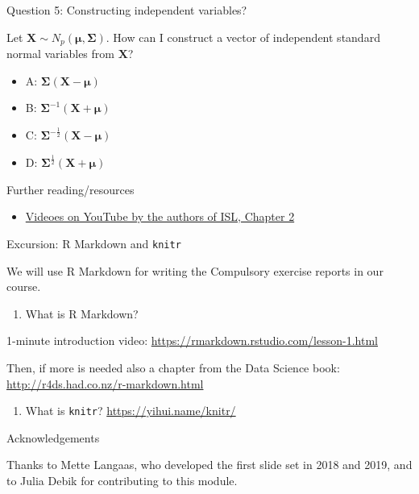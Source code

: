 \documentclass[ignorenonframetext,]{beamer}
\providecommand{\tightlist}{%
  \setlength{\itemsep}{0pt}\setlength{\parskip}{0pt}}
\begin{document}
\begin{frame}

\begin{block}{Question 5: Constructing independent variables?}

\vspace{2mm}

Let \(\boldsymbol{X}\sim N_p(\boldsymbol{\mu},\boldsymbol\Sigma)\). How
can I construct a vector of independent standard normal variables from
\(\boldsymbol{X}\)?

\begin{itemize}
\tightlist
\item
  A: \(\boldsymbol\Sigma(\boldsymbol{X}-\boldsymbol{\mu})\)
\item
  B: \(\boldsymbol\Sigma^{-1}(\boldsymbol{X}+\boldsymbol{\mu})\)
\item
  C:
  \(\boldsymbol\Sigma^{-\frac{1}{2}}(\boldsymbol{X}-\boldsymbol{\mu})\)
\item
  D:
  \(\boldsymbol\Sigma^{\frac{1}{2}}(\boldsymbol{X}+\boldsymbol{\mu})\)
\end{itemize}

\end{block}

\end{frame}

\begin{frame}

\end{frame}

\begin{frame}{ Further reading/resources}

\begin{itemize}
\tightlist
\item
  \href{https://www.youtube.com/playlist?list=PL5-da3qGB5IDvuFPNoSqheihPOQNJpzyy}{Videoes
  on YouTube by the authors of ISL, Chapter 2}
\end{itemize}

\end{frame}

\begin{frame}[fragile]{Excursion: R Markdown and \texttt{knitr}}

We will use R Markdown for writing the Compulsory exercise reports in
our course.

\begin{enumerate}
\def\labelenumi{\arabic{enumi})}
\tightlist
\item
  What is R Markdown?
\end{enumerate}

1-minute introduction video:
\url{https://rmarkdown.rstudio.com/lesson-1.html}

Then, if more is needed also a chapter from the Data Science book:
\url{http://r4ds.had.co.nz/r-markdown.html}

\begin{enumerate}
\def\labelenumi{\arabic{enumi})}
\setcounter{enumi}{1}
\tightlist
\item
  What is \texttt{knitr}? \url{https://yihui.name/knitr/}
\end{enumerate}

\end{frame}

\begin{frame}{Acknowledgements}

Thanks to Mette Langaas, who developed the first slide set in 2018 and
2019, and to Julia Debik for contributing to this module.

\end{frame}
\end{document}
